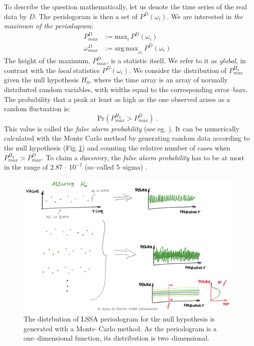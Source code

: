 To describe the question mathematically, let us denote the time series of the real data by $D$. The peridogoram is then a set of $P^D(\omega_i)$. We are interested in \emph{the maximum of the periodogram}:
\begin{align}
  P_{max}^D &:= \mathrm{max}_i\,P^D(\omega_i) \\
  \omega_{max}^D &:= \mathrm{arg\,max}_{\omega_i}\,P^D(\omega_i)
\end{align}
The height of the maximum, $P_{max}^D$, is a statistic itself. We refer to it as \emph{global}, in contrast with the \emph{local} statistics $P^D(\omega_i)$. We consider the distribution of $P_{max}^{H_0}$ given the null hypothesis $H_0$, where the time array is an array of normally distributed random variables, with widths equal to the corresponding error--bars. The probability that a peak at least as high as the one observed arises as a random fluctuation is:
\begin{equation}
  \mathrm{Pr}\left( P_{max}^{H_0} > P_{max}^D \right) \ .
\end{equation}
This value is called the \emph{false alarm probability} (see eg. \cite{Pandola2004}). It can be numerically calculated with the Monte Carlo method by generating random data according to the null hypothesis (Fig.\,\ref{fig:generating_null_hypothesis_periodogram}) and counting the relative number of cases when $P_{max}^{H_0} > P_{max}^D$. To claim a discovery, the \emph{false alarm probability} has to be at most in the range of $2.87\,\cdot\,10^{-7}$ (so--called 5--sigma) \cite{PDG2014}.

\begin{figure}[htb]
  \centering \includegraphics[width=\linewidth]{gfx/axions/null_hypothesis.png}
  \caption{The distrbution of LSSA periodogram for the null hypothesis is generated with a Monte--Carlo method. As the periodogram is a one--dimensional function, its distribution is two--dimensional.}
  \label{fig:generating_null_hypothesis_periodogram}
\end{figure}

